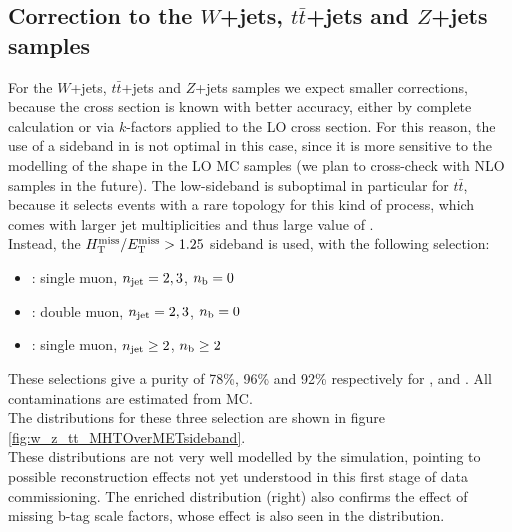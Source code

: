\subsection{Correction to the $W$+jets, $t\bar{t}$+jets and $Z$+jets samples}
\label{sec:sideband_corrections_w_z_tt}
For the $W$+jets, $t\bar{t}$+jets and $Z$+jets samples we expect smaller corrections, because the cross section is known 
with better accuracy, either by complete calculation or via $k$-factors applied to the LO cross section. 
For this reason, the use of a sideband in \scalht is not optimal in this case, since it is more sensitive to the modelling 
of the \scalht shape in the LO MC samples (we plan to cross-check with NLO samples in the future). 
The low-\scalht sideband is suboptimal in particular for $t\bar{t}$, because 
it selects events with a rare topology for this kind of process, which comes with larger jet multiplicities and thus large value of \scalht. \\
Instead, the $\mbox{$\mbox{$H_{\rm T}^{\rm miss}$} / \mbox{$E_\text{T}^{\rm miss}$}$} > 1.25$ sideband is used, with the following selection:
\begin{itemize}
\item \wj: single muon, $n_{\mathrm{jet}} = 2,3$, $n_{\text{b}} = 0$
\item \zj: double muon, $n_{\mathrm{jet}} = 2,3$, $n_{\text{b}} = 0$
\item \ttj: single muon, $n_{\mathrm{jet}} \geq 2$, $n_{\text{b}} \geq 2$
\end{itemize}

These selections give a purity of 78\%, 96\% and 92\% respectively for \wj, \zj and \ttj. All contaminations are estimated from MC.\\
The \mhtmet distributions for these three selection are shown in figure \ref{fig:w_z_tt_MHTOverMETsideband}. \\
These distributions are not very well modelled by the simulation, pointing to possible reconstruction effects not yet understood in this first stage of data commissioning. 
The \ttj enriched distribution (right) also confirms the effect of missing b-tag scale factors, whose effect is also seen in the \nb  distribution. %

